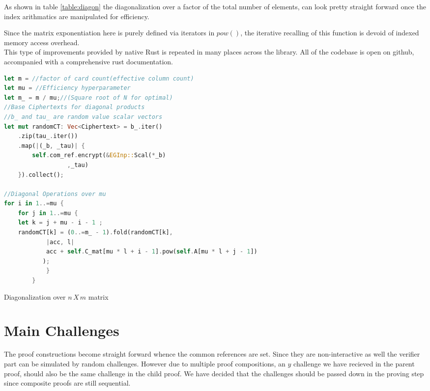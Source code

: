 \documentclass[12pt,a4paper]{report}
\begin{document}
As shown in table \ref{table:diagon} the diagonalization over a factor of the total number of elements,
can look pretty straight forward once the index arithmatics are manipulated for efficiency.

Since the matrix exponentiation here is purely defined via iterators in $pow()$, 
the iterative recalling of this function is devoid of indexed memory access overhead.\\

This type of improvements provided by native Rust is repeated in many places across the library.
All of the codebase is open on github\cite{repo}, accompanied with a comprehensive rust documentation.

\begin{table}
\begin{lstlisting}[language=Rust]
let m = //factor of card count(effective column count)
let mu = //Efficiency hyperparameter
let m_ = m / mu;//(Square root of N for optimal)
//Base Ciphertexts for diagonal products
//b_ and tau_ are random value scalar vectors
let mut randomCT: Vec<Ciphertext> = b_.iter()
	.zip(tau_.iter())
	.map(|(_b, _tau)| {
	    self.com_ref.encrypt(&EGInp::Scal(*_b) 
				  ,_tau)
	}).collect();

//Diagonal Operations over mu
for i in 1..=mu {
    for j in 1..=mu {
	let k = j + mu - i - 1 ;
	randomCT[k] = (0..=m_ - 1).fold(randomCT[k],
		    |acc, l|
			acc + self.C_mat[mu * l + i - 1].pow(self.A[mu * l + j - 1])
		   );
            }
        }
\end{lstlisting}
\caption{Diagonalization over $n\,X\,m$ matrix}
\label{table:diagon}
\end{table}

\section{Main Challenges}
The proof constructions become straight forward whence the common references are set. 
Since they are non-interactive as well the verifier part can be simulated by random challenges.
However due to multiple proof compositions, an $y$ challenge we have recieved in the parent proof,
should also be the same challenge in the child proof. We have decided that the challenges should be passed down in the proving step since composite proofs are still sequential.
\end{document}
